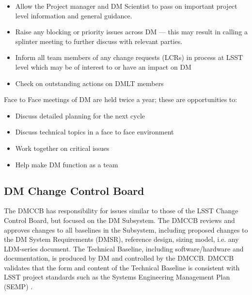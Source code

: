 \begin{itemize}
\item Allow the Project manager and DM Scientist  to pass on important project level information and general guidance.
\item Raise any blocking or priority issues across DM --- this may result in calling a splinter meeting to further discuss with relevant parties.
\item Inform all team members of any change requests (LCRs) in process at LSST level which may be of interest to or have an impact on DM
\item Check on outstanding actions on DMLT members
\end{itemize}

Face to Face meetings of DM are held twice a year; these are opportunities to:

\begin{itemize}
\item Discuss detailed planning for the next cycle
\item Discuss technical topics in a face to face environment
\item Work together on critical issues
\item Help make DM function as a team
\end{itemize}

\subsection{DM Change Control Board \label{sect:dmccb}}

The DMCCB has responsibility for issues similar to those of the LSST Change Control Board, but focused on the  DM Subsystem.
The DMCCB reviews and approves changes to all baselines in the Subsystem, including proposed changes to the DM System Requirements (DMSR), reference design, sizing model, i.e. any LDM-series document.
The Technical Baseline, including software/hardware and documentation, is produced by DM and controlled by the DMCCB.
DMCCB validates that the form and content of the Technical Baseline is consistent with LSST project standards such as the Systems Engineering Management Plan (SEMP) .

